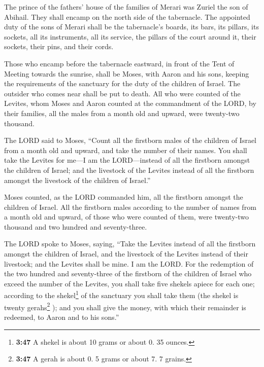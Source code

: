  The prince of the fathers' house of the families of
Merari was Zuriel the son of Abihail. They shall encamp on the north
side of the tabernacle.  The appointed duty of the sons
of Merari shall be the tabernacle's boards, its bars, its pillars, its
sockets, all its instruments, all its service,  the
pillars of the court around it, their sockets, their pins, and their
cords.

 Those who encamp before the tabernacle eastward, in
front of the Tent of Meeting towards the sunrise, shall be Moses, with
Aaron and his sons, keeping the requirements of the sanctuary for the
duty of the children of Israel. The outsider who comes near shall be put
to death.  All who were counted of the Levites, whom
Moses and Aaron counted at the commandment of the LORD, by their
families, all the males from a month old and upward, were twenty-two
thousand.

 The LORD said to Moses, ``Count all the firstborn males
of the children of Israel from a month old and upward, and take the
number of their names.  You shall take the Levites for
me---I am the LORD---instead of all the firstborn amongst the children
of Israel; and the livestock of the Levites instead of all the firstborn
amongst the livestock of the children of Israel.''

 Moses counted, as the LORD commanded him, all the
firstborn amongst the children of Israel.  All the
firstborn males according to the number of names from a month old and
upward, of those who were counted of them, were twenty-two thousand and
two hundred and seventy-three.

 The LORD spoke to Moses, saying,  ``Take
the Levites instead of all the firstborn amongst the children of Israel,
and the livestock of the Levites instead of their livestock; and the
Levites shall be mine. I am the LORD.  For the redemption
of the two hundred and seventy-three of the firstborn of the children of
Israel who exceed the number of the Levites,  you shall
take five shekels apiece for each one; according to the
shekel\footnote{\textbf{3:47} A shekel is about 10 grams or about 0. 35
  ounces.} of the sanctuary you shall take them (the shekel is twenty
gerahs\footnote{\textbf{3:47} A gerah is about 0. 5 grams or about 7. 7
  grains.} );  and you shall give the money, with which
their remainder is redeemed, to Aaron and to his sons.''

